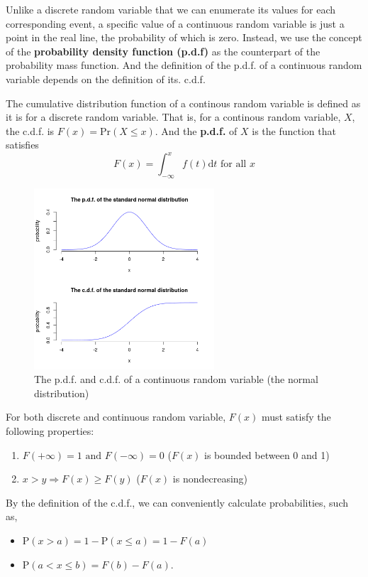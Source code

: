 \documentclass[a4paper,11pt]{article}
\begin{document}
Unlike a discrete random variable that we can enumerate its values for
each corresponding event, a specific value of a continuous random
variable is just a point in the real line, the probability of which is
zero. Instead, we use the concept of the \textbf{probability density function
(p.d.f)} as the counterpart of the probability mass function. And the
definition of the p.d.f. of a continuous random variable depends on
the definition of its. c.d.f.

The cumulative distribution function of a continous random variable
is defined as it is for a discrete random variable. That is, for a
continous random variable, \(X\), the c.d.f. is \(F(x) = \mathrm{Pr}(X
\leq x)\). And the \textbf{p.d.f.} of \(X\) is the function that satisfies
\[ F(x) = \int_{-\infty}^{x} f(t) \mathrm{d}t \text{ for all } x \]

\begin{figure}[htbp]
\centering
\includegraphics[width=0.6\textwidth,height=0.5\textheight]{figure/norm1.png}
\caption{\label{fig:orgb54da76}
The p.d.f. and c.d.f. of a continuous random variable (the normal distribution)}
\end{figure}

For both discrete and continuous random variable, \(F(x)\) must satisfy
the following properties:
\begin{enumerate}
\item \(F(+\infty) = 1 \text{ and } F(-\infty) = 0\) (\(F(x)\) is bounded between 0 and 1)
\item \(x > y \Rightarrow F(x) \geq F(y)\) (\(F(x)\) is nondecreasing)
\end{enumerate}

By the definition of the c.d.f., we can conveniently calculate
probabilities, such as,
\begin{itemize}
\item \(\mathrm{P}(x > a) = 1 - \mathrm{P}(x \leq a) = 1 - F(a)\)
\item \(\mathrm{P}(a < x \leq b) = F(b) - F(a)\).
\end{itemize}
\end{document}
